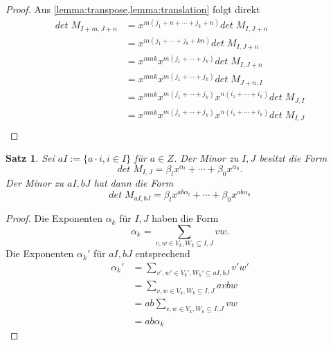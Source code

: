\documentclass{article}
\newtheorem{satz}{Satz}
\theoremstyle{definition}
\renewcommand{\det}{det\;}
\begin{document}
\begin{proof}
    Aus \cref{lemma:transpose,lemma:translation} folgt direkt
    \begin{align*}
        \det{} M_{I+m,J+n}  &= x^{m(j_1 + n +\cdots + j_k + n)} \det{} M_{I,J+n} \\
                            &= x^{m(j_1 +\cdots + j_k + kn)} \det{} M_{I,J+n} \\
                            &= x^{mnk} x^{m(j_1 +\cdots + j_k)} \det{} M_{I,J+n} \\
                            &= x^{mnk} x^{m(j_1 +\cdots + j_k)} \det{} M_{J+n,I} \\
                            &= x^{mnk} x^{m(j_1 +\cdots + j_k)} x^{n(i_1+\cdots +i_k)} \det{} M_{J,I} \\
                            &= x^{mnk} x^{m(j_1 +\cdots + j_k)} x^{n(i_1+\cdots +i_k)} \det{} M_{I,J} \\
    \end{align*}
\end{proof}

\begin{satz}
    Sei $aI := \{ a \cdot i, i \in I\}$ für $a \in Z$. Der Minor zu $I,J$ besitzt die Form  
    \begin{equation*}
        \det{} M_{I,J} = \beta_l x^{\alpha_l} + \cdots + \beta_0 x^{\alpha_0}.
    \end{equation*} 
    Der Minor zu $aI,bJ$ hat dann die Form
    \begin{equation*}
        \det{} M_{aI,bJ} =  \beta_l x^{ab \alpha_l} + \cdots + \beta_0 x^{ab \alpha_0}
    \end{equation*}
\end{satz}

\begin{proof}
    Die Exponenten $\alpha_k$ für $I,J$ haben die Form
    \begin{equation*}
        \alpha_k = \sum_{v,w \in V_k,W_k \subseteq I,J} vw.
    \end{equation*}  
    Die Exponenten $\alpha_k'$ für $aI,bJ$ entsprechend 
    \begin{align*}
        \alpha_k'   &= \sum_{v',w' \in V_k',W_k' \subseteq aI,bJ} v'w' \\
                    &= \sum_{v,w \in V_k,W_k \subseteq I,J} avbw \\
                    &= ab \sum_{v,w \in V_k,W_k \subseteq I,J} vw \\
                    &= ab \alpha_k
    \end{align*} 
\end{proof}
\end{document}
